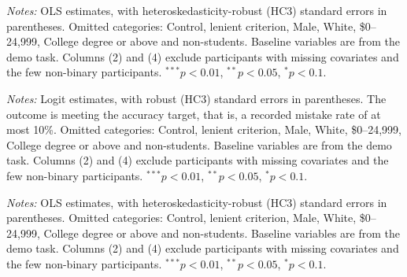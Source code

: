 \documentclass[12pt, letterpaper]{article}
\begin{document}
\begin{table}[p]
\centering
\caption{Treatment effects on sets completed (pooled sample)}\label{tab:reg-sets-full}
\begin{threeparttable}
\scriptsize\renewcommand{\arraystretch}{0.85}

\begin{tablenotes}[flushleft]
\scriptsize
\item \textit{Notes:} OLS estimates, with heteroskedasticity-robust (HC3) standard errors in parentheses. Omitted categories: Control, lenient criterion, Male, White, \$0--24,999, College degree or above and non-students. Baseline variables are from the demo task. Columns (2) and (4) exclude participants with missing covariates and the few non-binary participants. $^{***}p<0.01$, $^{**}p<0.05$, $^{*}p<0.1$.
\end{tablenotes}
\end{threeparttable}
\end{table}

\begin{table}[p]
\centering
\caption{Treatment effects on accuracy target achievement likelihood (lab sample)}\label{tab:reg-target-lab}
\begin{threeparttable}
\scriptsize\renewcommand{\arraystretch}{0.85}

\begin{tablenotes}[flushleft]
\scriptsize
\item \textit{Notes:} Logit estimates, with robust (HC3) standard errors in parentheses. The outcome is meeting the accuracy target, that is, a recorded mistake rate of at most 10\%. Omitted categories: Control, lenient criterion, Male, White, \$0--24,999, College degree or above and non-students. Baseline variables are from the demo task. Columns (2) and (4) exclude participants with missing covariates and the few non-binary participants. $^{***}p<0.01$, $^{**}p<0.05$, $^{*}p<0.1$.
\end{tablenotes}
\end{threeparttable}
\end{table}

\begin{table}[p]
\centering
\caption{Treatment effects on mistake rate (lab sample)}\label{tab:reg-mistakes-lab}
\begin{threeparttable}
\scriptsize\renewcommand{\arraystretch}{0.85}

\begin{tablenotes}[flushleft]
\scriptsize
\item \textit{Notes:} OLS estimates, with heteroskedasticity-robust (HC3) standard errors in parentheses. Omitted categories: Control, lenient criterion, Male, White, \$0--24,999, College degree or above and non-students. Baseline variables are from the demo task. Columns (2) and (4) exclude participants with missing covariates and the few non-binary participants. $^{***}p<0.01$, $^{**}p<0.05$, $^{*}p<0.1$.
\end{tablenotes}
\end{threeparttable}
\end{table}
\end{document}
